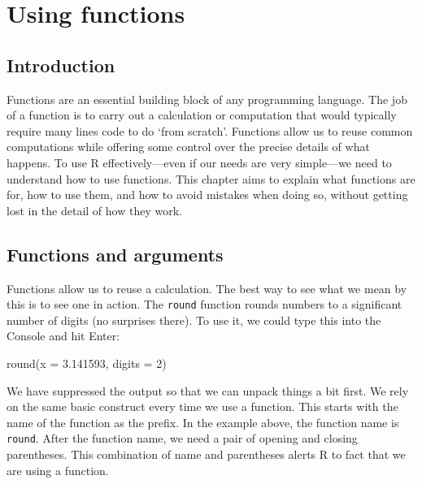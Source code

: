\documentclass[
]{book}
\newenvironment{Shaded}{\begin{snugshade}}{\end{snugshade}}
\newcommand{\AttributeTok}[1]{\textcolor[rgb]{0.77,0.63,0.00}{#1}}
\newcommand{\DecValTok}[1]{\textcolor[rgb]{0.00,0.00,0.81}{#1}}
\newcommand{\FloatTok}[1]{\textcolor[rgb]{0.00,0.00,0.81}{#1}}
\newcommand{\FunctionTok}[1]{\textcolor[rgb]{0.00,0.00,0.00}{#1}}
\newcommand{\NormalTok}[1]{#1}
\begin{document}
\hypertarget{using-functions}{%
\chapter{Using functions}\label{using-functions}}

\hypertarget{intro-functions}{%
\section{Introduction}\label{intro-functions}}

Functions are an essential building block of any programming language. The job of a function is to carry out a calculation or computation that would typically require many lines code to do `from scratch'. Functions allow us to reuse common computations while offering some control over the precise details of what happens. To use R effectively---even if our needs are very simple---we need to understand how to use functions. This chapter aims to explain what functions are for, how to use them, and how to avoid mistakes when doing so, without getting lost in the detail of how they work.

\hypertarget{functions-and-arguments}{%
\section{Functions and arguments}\label{functions-and-arguments}}

Functions allow us to reuse a calculation. The best way to see what we mean by this is to see one in action. The \texttt{round} function rounds numbers to a significant number of digits (no surprises there). To use it, we could type this into the Console and hit Enter:

\begin{Shaded}
\begin{Highlighting}[]
\FunctionTok{round}\NormalTok{(}\AttributeTok{x =} \FloatTok{3.141593}\NormalTok{, }\AttributeTok{digits =} \DecValTok{2}\NormalTok{)}
\end{Highlighting}
\end{Shaded}

We have suppressed the output so that we can unpack things a bit first. We rely on the same basic construct every time we use a function. This starts with the name of the function as the prefix. In the example above, the function name is \texttt{round}. After the function name, we need a pair of opening and closing parentheses. This combination of name and parentheses alerts R to fact that we are using a function.
\end{document}
